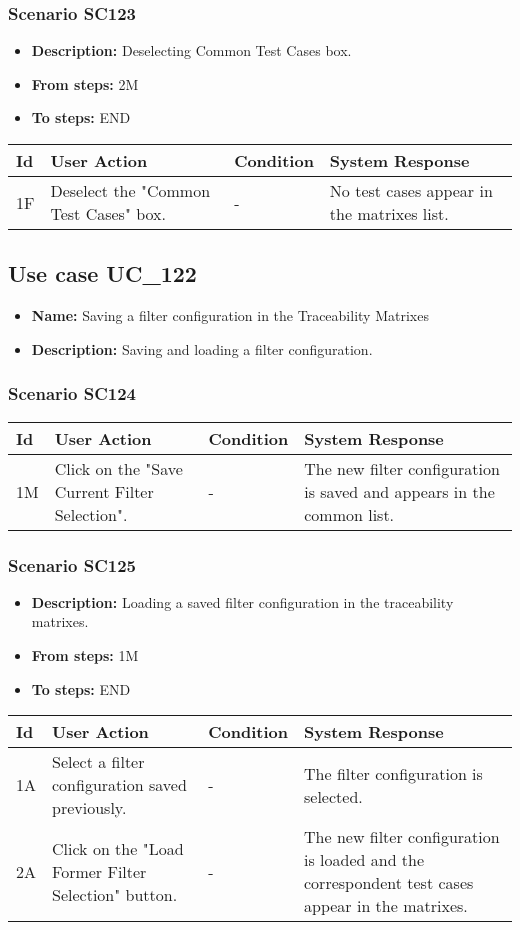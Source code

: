\documentclass[a4paper,11pt]{article}
\newcommand{\bl}{\\ \hline}
\begin{document}
\subsubsection*{Scenario SC123}
\begin{itemize}
\item {\bf Description:} Deselecting Common Test Cases box.
\item {\bf From steps:} 2M
\item {\bf To steps:} END
\end{itemize}
\begin{tabular}{|p{0.4in}|p{1.5in}|p{1.5in}|p{1.5in}|}
\hline
Id & User Action & Condition & System Response \bl 
1F & Deselect the "Common Test Cases" box. & - & No test cases appear in the matrixes list.\bl
\end{tabular}
\subsection*{Use case UC_122}
\begin{itemize}
\item {\bf Name: }Saving a filter configuration in the Traceability Matrixes
			
\item {\bf Description: }Saving and loading a filter configuration.
\end{itemize}
\subsubsection*{Scenario SC124}
\begin{tabular}{|p{0.4in}|p{1.5in}|p{1.5in}|p{1.5in}|}
\hline
Id & User Action & Condition & System Response \bl 
1M & Click on the "Save Current Filter Selection". & - & The new filter configuration is saved and appears in the
						common list.\bl
\end{tabular}
\subsubsection*{Scenario SC125}
\begin{itemize}
\item {\bf Description:} Loading a saved filter configuration in the
					traceability matrixes.
\item {\bf From steps:} 1M
\item {\bf To steps:} END
\end{itemize}
\begin{tabular}{|p{0.4in}|p{1.5in}|p{1.5in}|p{1.5in}|}
\hline
Id & User Action & Condition & System Response \bl 
1A & Select a filter configuration saved previously. & - & The filter configuration is selected.\bl
2A & Click on the "Load Former Filter Selection" button.
					 & - & The new filter configuration is loaded and the
						correspondent test cases appear in the matrixes.\bl
\end{tabular}
\end{document}
